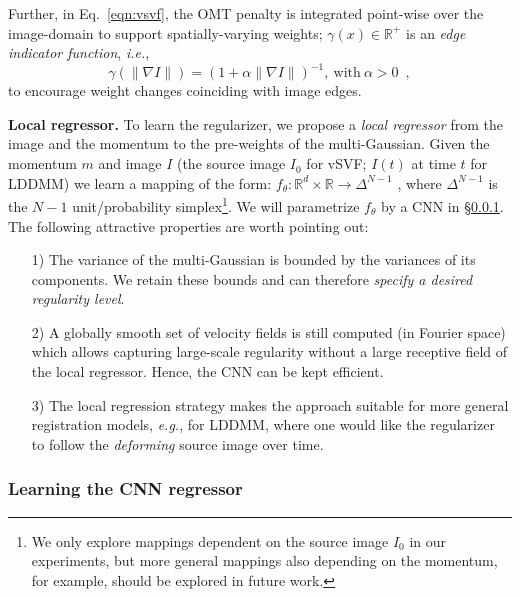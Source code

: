 \documentclass[10pt,twocolumn,letterpaper,table]{article}
\numberwithin{equation}{section}
\theoremstyle{plain}
\theoremstyle{definition}
\def\eg{\emph{e.g.}}  \def\Eg{\emph{E.g.}}
\def\ie{\emph{i.e.}}  \def\Ie{\emph{I.e.}}
\begin{document}
Further, in Eq.~\eqref{eqn:vsvf}, the OMT penalty is integrated point-wise over the image-domain to support spatially-varying weights; $\gamma(x)\in\mathbb{R}^+$ is an 
\emph{edge indicator function}, \ie, 
$$\gamma(\|\nabla I\|)=(1+\alpha\|\nabla I\|)^{-1},~\text{with}~\alpha>0\enspace,$$ 
to encourage weight changes coinciding with image edges. 

\noindent
\textbf{Local regressor.}
To learn the regularizer, we propose a {\it local regressor} from the image and the momentum to the pre-weights of the multi-Gaussian. Given the momentum $m$ and image $I$ (the source image $I_0$ for vSVF; $I(t)$ at time $t$ for LDDMM) we learn a mapping of the form: 
$f_{\theta}:\mathbb{R}^d\times\mathbb{R}\to\Delta^{N-1}$ 
, where $\Delta^{N-1}$ is the $N-1$ unit/probability simplex\footnote{We only explore mappings dependent on the source image $I_0$ in our experiments, but more general mappings also depending on the momentum, for example, should be explored in future work.}. We will parametrize $f_{\theta}$ by a CNN in  
\S\ref{subsection:cnn_regressor}. The following attractive properties are worth pointing out:
\begin{itemize}[leftmargin=14pt]
\setlength\itemsep{-1pt}
\item[1)] The variance of the multi-Gaussian is bounded by the variances of its components. We retain these bounds and can therefore \emph{specify a desired regularity level}.
\item[2)] A globally smooth set of velocity fields is still computed (in Fourier space) which allows capturing large-scale regularity without a large receptive field of the local regressor. Hence, the CNN can be kept  efficient.
  \item[3)] The local regression strategy makes the approach suitable for more general registration models, \eg, for LDDMM, where one would like the regularizer to follow the \emph{deforming} source image over time.
\end{itemize}


\subsubsection{Learning the CNN regressor}
\label{subsection:cnn_regressor}
\end{document}
